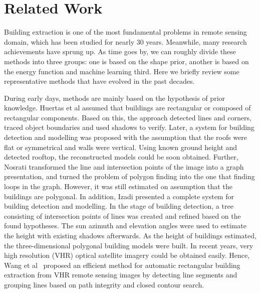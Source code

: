 \section{Related Work}
\label{Sec:RelatedWork}


Building extraction is one of the most fundamental problems in remote sensing domain, which has been studied for nearly 30 years. Meanwhile, many research achievements have sprung up. As time goes by, we can roughly divide these methods into three groups: one is based on the shape prior, another is based on the energy function and machine learning third. Here we briefly review some representative methods that have evolved in the past decades.



During early days, methods are mainly based on the hypothesis of prior knowledge. Huertas et al \cite{IEEEexample:huertas1988detecting} assumed that buildings are rectangular or composed of rectangular components. Based on this, the approach detected lines and corners, traced object boundaries and used shadows to verify. Later, a system \cite{IEEEexample:noronha2001detection} for building detection and modelling was proposed with the assumption that the roofs were flat or symmetrical and walls were vertical. Using known ground height and detected rooftop, the reconstructed models could be soon obtained. Further, Nosrati \cite{IEEEexample:nosrati2009novel} transformed the line and intersection points of the image into a graph presentation, and turned the problem of polygon finding into the one that finding loops in the graph. However, it was still estimated on assumption that the buildings are polygonal. In addition, Izadi \cite{IEEEexample:izadi2012three} presented a complete system for building detection and modelling. In the stage of building detection, a tree consisting of intersection points of lines was created and refined based on the found hypotheses. The sun azimuth and elevation angles were used to estimate the height with existing shadows afterwards. As the height of buildings estimated, the three-dimensional polygonal building models were built. In recent years, very high resolution (VHR) optical satellite imagery could be obtained easily. Hence, Wang et al~\cite{IEEEexample:wang2015efficient} proposed an efficient method for automatic rectangular building extraction from VHR remote sensing images by detecting line segments and grouping lines based on path integrity and closed contour search.


